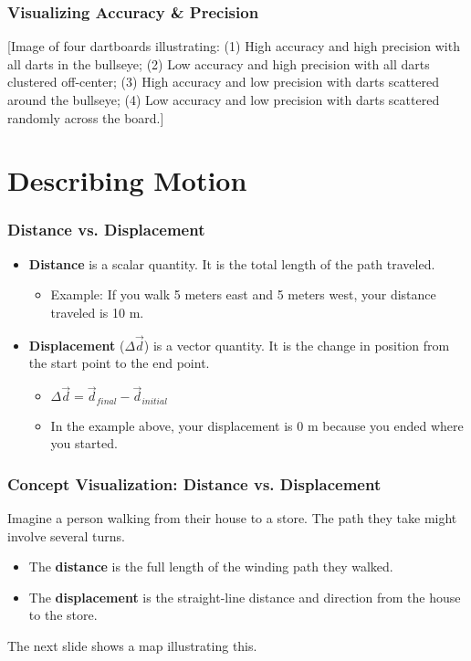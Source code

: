 \documentclass{beamer}
\begin{document}
\begin{frame}
\frametitle{Visualizing Accuracy \& Precision}
\alert{[Image of four dartboards illustrating: (1) High accuracy and high precision with all darts in the bullseye; (2) Low accuracy and high precision with all darts clustered off-center; (3) High accuracy and low precision with darts scattered around the bullseye; (4) Low accuracy and low precision with darts scattered randomly across the board.]}
\end{frame}

\section{Describing Motion}

\begin{frame}
\frametitle{Distance vs. Displacement}
\begin{itemize}
    \item \textbf{Distance} is a \alert{scalar} quantity. It is the total length of the path traveled.
    \begin{itemize}
        \item Example: If you walk 5 meters east and 5 meters west, your distance traveled is 10 m.
    \end{itemize}
    \item \textbf{Displacement} ($\Delta\vec{d}$) is a \alert{vector} quantity. It is the change in position from the start point to the end point.
    \begin{itemize}
        \item $\Delta\vec{d} = \vec{d}_{final} - \vec{d}_{initial}$
        \item In the example above, your displacement is 0 m because you ended where you started.
    \end{itemize}
\end{itemize}
\end{frame}

\begin{frame}
\frametitle{Concept Visualization: Distance vs. Displacement}
Imagine a person walking from their house to a store. The path they take might involve several turns.
\begin{itemize}
    \item The \textbf{distance} is the full length of the winding path they walked.
    \item The \textbf{displacement} is the straight-line distance and direction from the house to the store.
\end{itemize}
The next slide shows a map illustrating this.
\end{frame}
\end{document}
